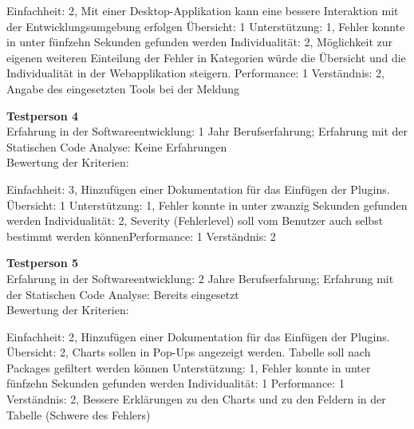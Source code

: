 Einfachheit: 2, Mit einer Desktop-Applikation kann eine bessere Interaktion mit der Entwicklungsumgebung erfolgen \newline Übersicht: 1 \newline  Unterstützung: 1, Fehler konnte in unter fünfzehn Sekunden gefunden werden \newline Individualität: 2, Möglichkeit zur eigenen weiteren Einteilung der Fehler in Kategorien würde die Übersicht und die Individualität in der Webapplikation steigern.  \newline Performance: 1 \newline  Verständnis: 2, Angabe des eingesetzten Tools bei der Meldung\newline 

\textbf{Testperson 4} \\
Erfahrung in der Softwareentwicklung: 1 Jahr Berufserfahrung; Erfahrung mit der Statischen Code Analyse: Keine Erfahrungen\\
Bewertung der Kriterien:

Einfachheit: 3, Hinzufügen einer Dokumentation für das Einfügen der Plugins.  \newline Übersicht: 1 \newline  Unterstützung: 1, Fehler konnte in unter zwanzig Sekunden gefunden werden \newline Individualität: 2, Severity (Fehlerlevel) soll vom Benutzer auch selbst bestimmt werden können\newline Performance: 1 \newline  Verständnis: 2\newline 

\textbf{Testperson 5} \\
Erfahrung in der Softwareentwicklung: 2 Jahre Berufserfahrung; Erfahrung mit der Statischen Code Analyse: Bereits eingesetzt\\
Bewertung der Kriterien:

Einfachheit: 2, Hinzufügen einer Dokumentation für das Einfügen der Plugins.  \newline Übersicht: 2, Charts sollen in Pop-Ups angezeigt werden. Tabelle soll nach Packages gefiltert werden können \newline  Unterstützung: 1, Fehler konnte in unter fünfzehn Sekunden gefunden werden \newline Individualität: 1 \newline Performance: 1 \newline  Verständnis: 2, Bessere Erklärungen zu den Charts und zu den Feldern in der Tabelle (Schwere des Fehlers)\newline 

